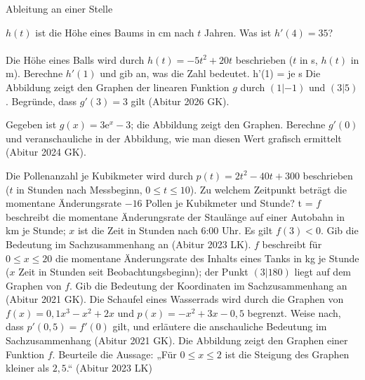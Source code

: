 \setcounter{aufgabe}{11}

\begin{aufgabe}{Ableitung an einer Stelle}
\begin{teile}
\teil $h(t)$ ist die Höhe eines Baums in cm nach $t$ Jahren. Was ist $h'(4) = 35$? \\  \\ 
\teil Die Höhe eines Balls wird durch $h(t) = -5t^2 + 20t$ beschrieben ($t$ in s, $h(t)$ in m). Berechne $h'(1)$ und gib an, was die Zahl bedeutet. h'(1) = \leerfeld[m] je s
\teil Die Abbildung zeigt den Graphen der linearen Funktion $g$ durch $(1 | -1)$ und $(3 | 5)$. Begründe, dass $g'(3) = 3$ gilt \hfill (Abitur 2026 GK).

\begin{ksys}[xmin=-1,xmax=4,ymin=-3,ymax=7,ablesen]\end{ksys}
\teil Gegeben ist $g(x) = 3\mathrm{e}^x - 3$; die Abbildung zeigt den Graphen. Berechne $g'(0)$ und veranschauliche in der Abbildung, wie man diesen Wert grafisch ermittelt \hfill (Abitur 2024 GK).

\begin{ksys}[xmin=-3,xmax=2,ymin=-4,ymax=8,ablesen]\end{ksys}
\teil Die Pollenanzahl je Kubikmeter wird durch $p(t) = 2t^2 - 40t + 300$ beschrieben ($t$ in Stunden nach Messbeginn, $0 \le t \le 10$). Zu welchem Zeitpunkt beträgt die momentane Änderungsrate $-16$ Pollen je Kubikmeter und Stunde? t = \leerfeld
\teil $f$ beschreibt die momentane Änderungsrate der Staulänge auf einer Autobahn in km je Stunde; $x$ ist die Zeit in Stunden nach 6:00 Uhr. Es gilt $f(3) < 0$. Gib die Bedeutung im Sachzusammenhang an \hfill (Abitur 2023 LK).
\teil $f$ beschreibt für $0 \le x \le 20$ die momentane Änderungsrate des Inhalts eines Tanks in kg je Stunde ($x$ Zeit in Stunden seit Beobachtungsbeginn); der Punkt $(3 | 180)$ liegt auf dem Graphen von $f$. Gib die Bedeutung der Koordinaten im Sachzusammenhang an \hfill (Abitur 2021 GK).
\teil Die Schaufel eines Wasserrads wird durch die Graphen von $f(x) = 0{,}1x^3 - x^2 + 2x$ und $p(x) = -x^2 + 3x - 0{,}5$ begrenzt. Weise nach, dass $p'(0{,}5) = f'(0)$ gilt, und erläutere die anschauliche Bedeutung im Sachzusammenhang \hfill (Abitur 2021 GK).
\teil Die Abbildung zeigt den Graphen einer Funktion $f$. Beurteile die Aussage: „Für $0 \le x \le 2$ ist die Steigung des Graphen kleiner als $2{,}5$.“ \hfill (Abitur 2023 LK)


\end{teile}
\end{aufgabe}
